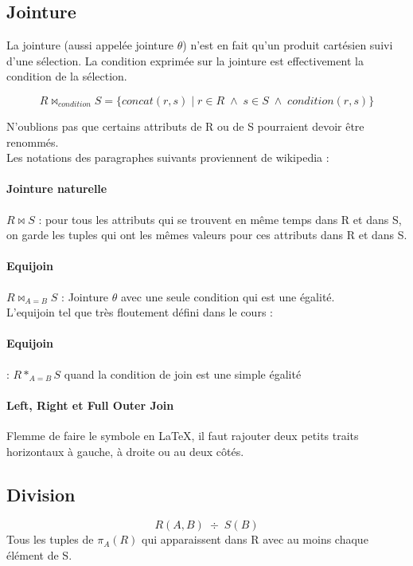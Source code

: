 \documentclass[a4paper]{article}
\begin{document}
  \subsection{Jointure}
  La jointure (aussi appelée jointure $\theta$) n'est en fait qu'un produit cartésien suivi d'une sélection. 
  La condition exprimée sur la jointure est effectivement la condition de la sélection.

  $$R \bowtie_{condition} S = \{concat(r,s)\; |\; r \in R\; \land \; s \in S\; \land \; condition(r,s)\} $$

  N'oublions pas que certains attributs de R ou de S pourraient devoir être renommés.\\

  Les notations des paragraphes suivants proviennent de wikipedia :

  \paragraph{Jointure naturelle} $R \bowtie S$ : pour tous les attributs qui se trouvent en même temps dans R et dans S, on garde les tuples qui ont les mêmes 
  valeurs pour ces attributs dans R et dans S.

  \paragraph{Equijoin} $R \bowtie_{A=B} S$ : Jointure $\theta$ avec une seule 
  condition qui est une égalité.\\

  L'equijoin tel que très floutement défini dans le cours :

  \paragraph{Equijoin} : $R *_{A=B} S$ quand la condition de join est une simple égalité

  \paragraph{Left, Right et Full Outer Join} Flemme de faire le symbole en \LaTeX,
  il faut rajouter deux petits traits horizontaux à gauche, à droite ou au deux
  côtés.

  \subsection{Division}
  $$ R(A,B)\; \div\; S(B) $$
  Tous les tuples de $\pi_{A}(R)$ qui apparaissent dans R avec au moins chaque
  élément de S.
\end{document}
